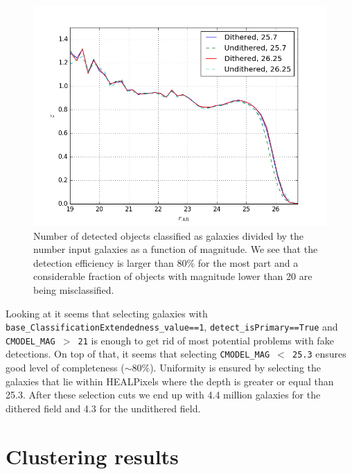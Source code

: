 \documentclass[\docopts]{\docclass}
\begin{document}
\begin{figure}
\centering
\includegraphics[width=0.9\columnwidth]{completeness.png}
\caption{Number of detected objects classified as galaxies divided by the number input galaxies as a function of magnitude. We see that the detection efficiency is larger than 80\% for the most part and a considerable fraction of objects with magnitude lower than 20 are being misclassified.}
\label{fig:completeness}
\end{figure}

Looking at  it seems that selecting galaxies with \texttt{base\_ClassificationExtendedness\_value==1}, \texttt{detect\_isPrimary==True} and \texttt{CMODEL\_MAG $>$ 21} is enough to get rid of most potential problems with fake detections. On top of that, it seems that selecting \texttt{CMODEL\_MAG $<$ 25.3} ensures good level of completeness ($\sim 80\%$). Uniformity is ensured by selecting the galaxies that lie within HEALPixels where the depth is greater or equal than 25.3. After these selection cuts we end up with 4.4 million galaxies for the dithered field and 4.3 for the undithered field. 

\section{Clustering results}
\label{sec:results}
\end{document}

